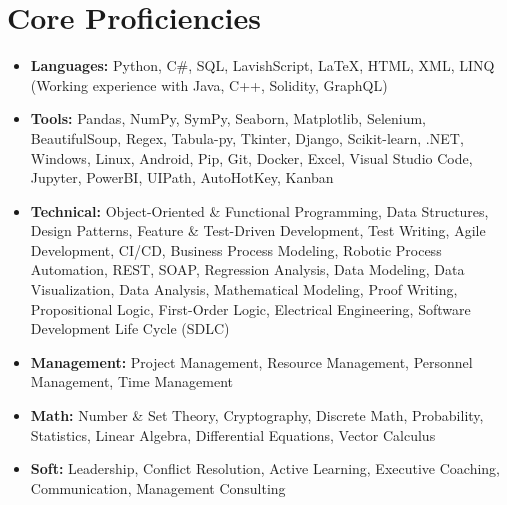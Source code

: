 \section*{Core Proficiencies}
\begin{itemize}[noitemsep]
\item \textbf{Languages:} Python, C\#, SQL, LavishScript, LaTeX, HTML, XML, LINQ (Working experience with Java, C++, Solidity, GraphQL)
\item \textbf{Tools:} Pandas, NumPy, SymPy, Seaborn, Matplotlib, Selenium, BeautifulSoup, Regex, Tabula-py, Tkinter, Django, Scikit-learn, .NET, Windows, Linux, Android, Pip, Git, Docker, Excel, Visual Studio Code, Jupyter, PowerBI, UIPath, AutoHotKey, Kanban
\item \textbf{Technical:} Object-Oriented \& Functional Programming, Data Structures, Design Patterns, Feature \& Test-Driven Development, Test Writing, Agile Development, CI/CD, Business Process Modeling, Robotic Process Automation, REST, SOAP, Regression Analysis, Data Modeling, Data Visualization, Data Analysis, Mathematical Modeling, Proof Writing, Propositional Logic, First-Order Logic, Electrical Engineering, Software Development Life Cycle (SDLC)
\item \textbf{Management:} Project Management, Resource Management, Personnel Management, Time Management
\item \textbf{Math:} Number \& Set Theory, Cryptography, Discrete Math, Probability, Statistics, Linear Algebra, Differential Equations, Vector Calculus
\item \textbf{Soft:} Leadership, Conflict Resolution, Active Learning, Executive Coaching, Communication, Management Consulting
\end{itemize}
